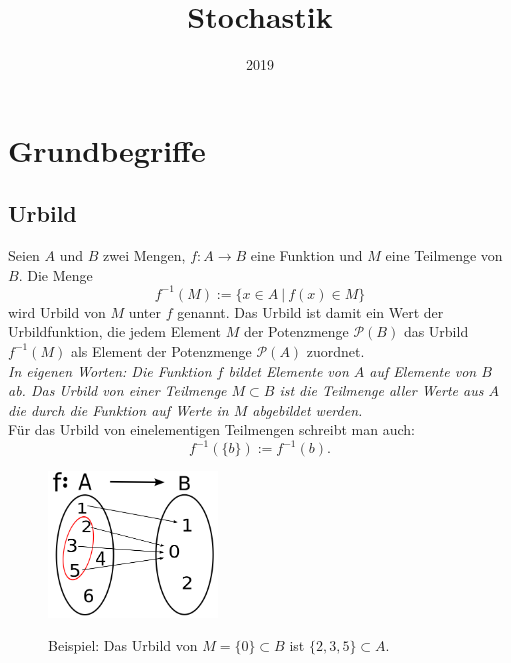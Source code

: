 \documentclass[paper=a4,10pt]{scrartcl}
\title{Stochastik}
\date{2019}
\begin{document}
\maketitle
\newpage
\tableofcontents
\newpage
{}
\setcounter{page}{1}
\section{Grundbegriffe}
\subsection{Urbild}
Seien $A$ und $B$ zwei Mengen, $f: A \rightarrow B$ eine Funktion und $M$ eine Teilmenge von $B$. Die Menge
\begin{equation}
f^{-1}(M) := \{ x \in A \ | \ f(x) \in M \}
\end{equation}
wird Urbild von $M$ unter $f$ genannt. Das Urbild ist damit ein Wert der Urbildfunktion, die jedem Element $M$ der Potenzmenge $\mathcal{P}(B)$ das Urbild $f^{-1}(M)$ als Element der Potenzmenge $\mathcal{P}(A)$ zuordnet.\\

\noindent
\textit{In eigenen Worten: Die Funktion $f$ bildet Elemente von $A$ auf Elemente von $B$ ab. Das Urbild von einer Teilmenge $M \subset B$ ist die Teilmenge aller Werte aus $A$ die durch die Funktion auf Werte in $M$ abgebildet werden.}\\

\noindent
Für das Urbild von einelementigen Teilmengen schreibt man auch:
\begin{equation}
f^{-1}(\{b\}) := f^{-1}(b).
\end{equation}

\begin{figure}[h]
\centering
\includegraphics[width=0.4\textwidth]{../Bilder/urbild.png}
\label{urbild}
\caption{Beispiel: Das Urbild von $M=\{0\} \subset B$ ist $\{2,3,5\} \subset A$.}
\end{figure}
\end{document}
